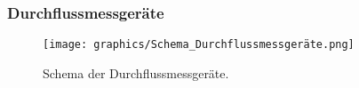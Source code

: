 \subsubsection{Durchflussmessgeräte}
\label{subsubsec:Durchflussmessgeräte}

\begin{figure}[h!]
	\centering
	\texttt{[image: graphics/Schema\_Durchflussmessgeräte.png]}
	\caption{Schema der Durchflussmessgeräte.}
	\label{fig:Schema_Durchflussmessgeräte}
\end{figure}